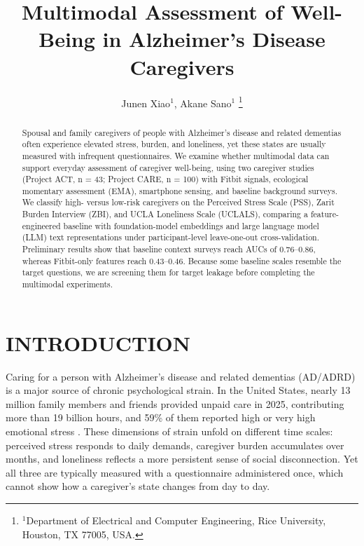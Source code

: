 \documentclass[letterpaper, 10 pt, conference]{ieeeconf}  %
\title{\LARGE \bf
Multimodal Assessment of Well-Being in Alzheimer’s Disease Caregivers
}
\author{%
Junen Xiao$^{1}$, Akane Sano$^{1}$%
\thanks{$^{1}$Department of Electrical and Computer Engineering, Rice University, Houston, TX 77005, USA.}%
}
\begin{document}
\maketitle
\thispagestyle{empty}
\pagestyle{empty}


\begin{abstract}
Spousal and family caregivers of people with Alzheimer’s disease and related dementias often experience elevated stress, burden, and loneliness, yet these states are usually measured with infrequent questionnaires. We examine whether multimodal data can support everyday assessment of caregiver well-being, using two caregiver studies (Project ACT, n = 43; Project CARE, n = 100) with Fitbit signals, ecological momentary assessment (EMA), smartphone sensing, and baseline background surveys. We classify high- versus low-risk caregivers on the Perceived Stress Scale (PSS), Zarit Burden Interview (ZBI), and UCLA Loneliness Scale (UCLALS), comparing a feature-engineered baseline with foundation-model embeddings and large language model (LLM) text representations under participant-level leave-one-out cross-validation. Preliminary results show that baseline context surveys reach AUCs of 0.76--0.86, whereas Fitbit-only features reach 0.43--0.46. Because some baseline scales resemble the target questions, we are screening them for target leakage before completing the multimodal experiments.
\end{abstract}


\section{INTRODUCTION}
Caring for a person with Alzheimer's disease and related dementias (AD/ADRD) is a major source of chronic psychological strain. In the United States, nearly 13 million family members and friends provided unpaid care in 2025, contributing more than 19 billion hours, and 59\% of them reported high or very high emotional stress \cite{alz2026}. These dimensions of strain unfold on different time scales: perceived stress \cite{cohen1983} responds to daily demands, caregiver burden \cite{gratao2019} accumulates over months, and loneliness \cite{russell1996} reflects a more persistent sense of social disconnection. Yet all three are typically measured with a questionnaire administered once, which cannot show how a caregiver's state changes from day to day.
\end{document}
